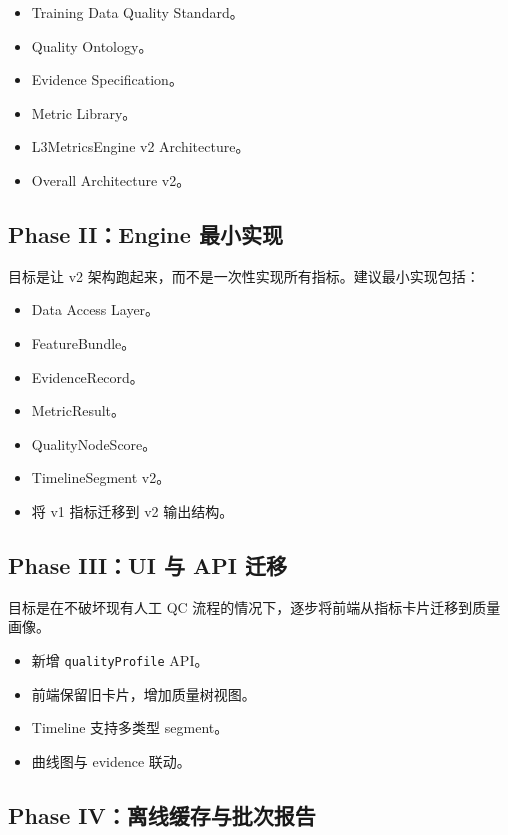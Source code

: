 \documentclass[UTF8,zihao=-4,oneside,openany]{ctexrep}
\newcommand{\Code}[1]{\texttt{#1}}
\begin{document}
\begin{itemize}
\item Training Data Quality Standard。
\item Quality Ontology。
\item Evidence Specification。
\item Metric Library。
\item L3MetricsEngine v2 Architecture。
\item Overall Architecture v2。
\end{itemize}

\subsection{Phase II：Engine 最小实现}

目标是让 v2 架构跑起来，而不是一次性实现所有指标。建议最小实现包括：

\begin{itemize}
\item Data Access Layer。
\item FeatureBundle。
\item EvidenceRecord。
\item MetricResult。
\item QualityNodeScore。
\item TimelineSegment v2。
\item 将 v1 指标迁移到 v2 输出结构。
\end{itemize}

\subsection{Phase III：UI 与 API 迁移}

目标是在不破坏现有人工 QC 流程的情况下，逐步将前端从指标卡片迁移到质量画像。

\begin{itemize}
\item 新增 \Code{qualityProfile} API。
\item 前端保留旧卡片，增加质量树视图。
\item Timeline 支持多类型 segment。
\item 曲线图与 evidence 联动。
\end{itemize}

\subsection{Phase IV：离线缓存与批次报告}
\end{document}
